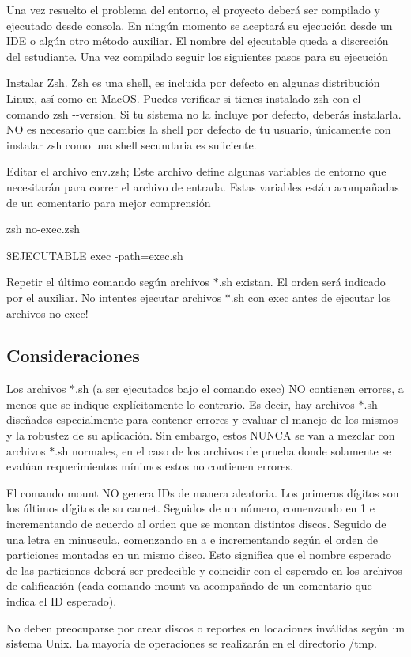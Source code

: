 Una vez resuelto el problema del entorno, el proyecto deberá ser compilado y ejecutado desde consola. En ningún momento se aceptará su ejecución desde un I\+DE o algún otro método auxiliar. El nombre del ejecutable queda a discreción del estudiante. Una vez compilado seguir los siguientes pasos para su ejecución
\begin{DoxyItemize}
\item Instalar Zsh. Zsh es una shell, es incluída por defecto en algunas distribución Linux, así como en Mac\+OS. Puedes verificar si tienes instalado zsh con el comando {\ttfamily zsh -\/-\/version}. Si tu sistema no la incluye por defecto, deberás instalarla. NO es necesario que cambies la shell por defecto de tu usuario, únicamente con instalar zsh como una shell secundaria es suficiente.
\item Editar el archivo {\ttfamily env.\+zsh}; Este archivo define algunas variables de entorno que necesitarán para correr el archivo de entrada. Estas variables están acompañadas de un comentario para mejor comprensión
\item {\ttfamily zsh no-\/exec.\+zsh}
\item {\ttfamily \$\+E\+J\+E\+C\+U\+T\+A\+B\+LE exec -\/path=exec.\+sh}
\item Repetir el último comando según archivos $\ast$.sh existan. El orden será indicado por el auxiliar. No intentes ejecutar archivos $\ast$.sh con exec antes de ejecutar los archivos no-\/exec!
\end{DoxyItemize}

\subsection*{Consideraciones}


\begin{DoxyItemize}
\item Los archivos $\ast$.sh (a ser ejecutados bajo el comando exec) NO contienen errores, a menos que se indique explícitamente lo contrario. Es decir, hay archivos $\ast$.sh diseñados especialmente para contener errores y evaluar el manejo de los mismos y la robustez de su aplicación. Sin embargo, estos N\+U\+N\+CA se van a mezclar con archivos $\ast$.sh normales, en el caso de los archivos de prueba donde solamente se evalúan requerimientos mínimos estos no contienen errores.
\item El comando mount NO genera I\+Ds de manera aleatoria. Los primeros dígitos son los últimos dígitos de su carnet. Seguidos de un número, comenzando en 1 e incrementando de acuerdo al orden que se montan distintos discos. Seguido de una letra en minuscula, comenzando en a e incrementando según el orden de particiones montadas en un mismo disco. Esto significa que el nombre esperado de las particiones deberá ser predecible y coincidir con el esperado en los archivos de calificación (cada comando mount va acompañado de un comentario que indica el ID esperado).
\item No deben preocuparse por crear discos o reportes en locaciones inválidas según un sistema Unix. La mayoría de operaciones se realizarán en el directorio /tmp.
\end{DoxyItemize}

